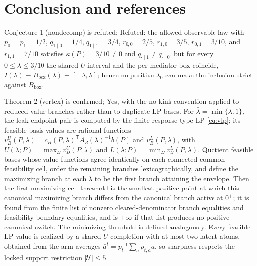 \documentclass[11pt]{article}
\theoremstyle{definition}
\theoremstyle{plain}
\theoremstyle{remark}
\begin{document}
\section{Conclusion and references}
Conjecture 1 (nondecomp) is refuted; Refuted: the allowed observable law with \(p_0=p_1=1/2\), \(q_{1\mid0}=1/4\), \(q_{1\mid1}=3/4\), \(r_{0,0}=2/5\), \(r_{1,0}=3/5\), \(r_{0,1}=3/10\), and \(r_{1,1}=7/10\) satisfies \(\kappa(P)=3/10\neq0\) and \(q_{\cdot\mid1}\neq q_{\cdot\mid0}\), but for every \(0\le\lambda\le3/10\) the shared-\(U\) interval and the per-mediator box coincide, \(I(\lambda)=B_{\mathrm{box}}(\lambda)=[-\lambda,\lambda]\); hence no positive \(\lambda_0\) can make the inclusion strict against \(B_{\mathrm{box}}\).

Theorem 2 (vertex) is confirmed; Yes, with the no-kink convention applied to reduced value branches rather than to duplicate LP bases. For $\bar\lambda=\min\{\lambda,1\}$, the leak endpoint pair is computed by the finite response-type LP \eqref{eq:vlp}; its feasible-basis values are rational functions $v_B^U(P,\lambda)=c_B(P,\lambda)^\mathsf{T}A_B(\lambda)^{-1}b(P)$ and $v_B^L(P,\lambda)$, with $U(\lambda;P)=\max_B v_B^U(P,\lambda)$ and $L(\lambda;P)=\min_B v_B^L(P,\lambda)$. Quotient feasible bases whose value functions agree identically on each connected common-feasibility cell, order the remaining branches lexicographically, and define the maximizing branch at each $\lambda$ to be the first branch attaining the envelope. Then the first maximizing-cell threshold is the smallest positive point at which this canonical maximizing branch differs from the canonical branch active at $0^+$; it is found from the finite list of nonzero cleared-denominator branch equalities and feasibility-boundary equalities, and is $+\infty$ if that list produces no positive canonical switch. The minimizing threshold is defined analogously. Every feasible LP value is realized by a shared-$U$ completion with at most two latent atoms, obtained from the arm averages $\bar a^t=p_t^{-1}\sum_a\rho_{t,a}a$, so sharpness respects the locked support restriction $|\mathcal U|\le5$.
\end{document}
